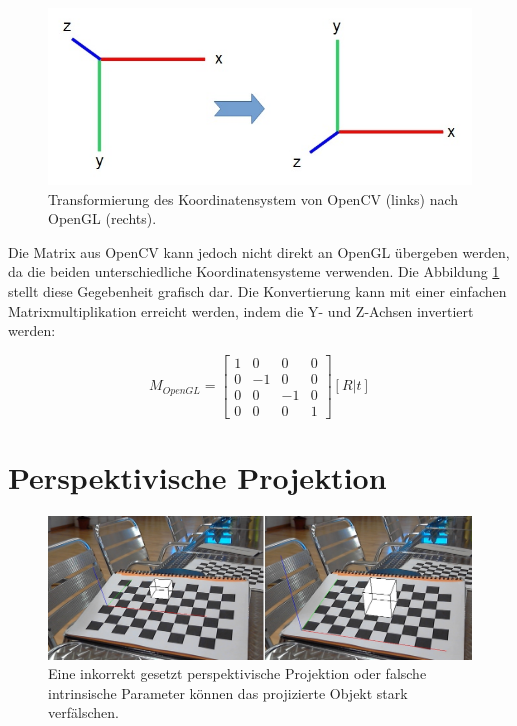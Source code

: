 \begin{figure}[!ht]
\centering
\includegraphics[scale=0.5]{images/opencv-to-opengl.jpg} 
\caption{Transformierung des Koordinatensystem von OpenCV (links) nach OpenGL (rechts).}
\label{fig:opencv-to-opengl}
\end{figure}

\noindent
Die Matrix aus OpenCV kann jedoch nicht direkt an OpenGL übergeben werden, da die beiden unterschiedliche Koordinatensysteme verwenden. Die Abbildung \ref{fig:opencv-to-opengl} stellt diese Gegebenheit grafisch dar. Die Konvertierung kann mit einer einfachen Matrixmultiplikation erreicht werden, indem die Y- und Z-Achsen invertiert werden:

\begin{equation}
M_{OpenGL}
=
\begin{bmatrix}
1 & 0 & 0 & 0 \\
0 & -1 & 0 & 0 \\
0 & 0 & -1 & 0 \\
0 & 0 & 0 & 1
\end{bmatrix} 
[R | t]
\end{equation}

 
\section{Perspektivische Projektion}

\begin{figure}[!ht]
\centering
\includegraphics[scale=0.5]{images/opengl-perspective.jpg} 
\caption{Eine inkorrekt gesetzt perspektivische Projektion oder falsche intrinsische Parameter können das projizierte Objekt stark verfälschen.}
\label{fig:opencv-perspektive}
\end{figure}


